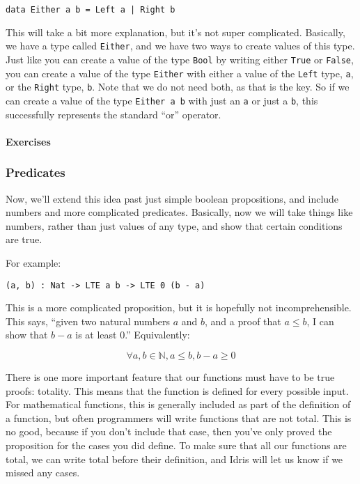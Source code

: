 \documentclass{article}
\newcommand{\inline}[1]{\texttt{#1}}
\begin{document}
\begin{verbatim}
data Either a b = Left a | Right b
\end{verbatim}

This will take a bit more explanation, but it's not super complicated.
Basically, we have a type called \inline{Either}, and we have two ways to create values of this type.
Just like you can create a value of the type \inline{Bool} by writing either \inline{True} or \inline{False}, you can create a value of the type \inline{Either} with either a value of the \inline{Left} type, \inline{a}, or the \inline{Right} type, \inline{b}.
Note that we do not need both, as that is the key.
So if we can create a value of the type \inline{Either a b} with just an \inline{a} or just a \inline{b}, this successfully represents the standard ``or'' operator.

\paragraph{Exercises}

\subsubsection{Predicates}
Now, we’ll extend this idea past just simple boolean propositions, and include numbers and more complicated predicates.
Basically, now we will take things like numbers, rather than just values of any type, and show that certain conditions are true.

For example:

\begin{verbatim}
(a, b) : Nat -> LTE a b -> LTE 0 (b - a)
\end{verbatim}

This is a more complicated proposition, but it is hopefully not incomprehensible.
This says, “given two natural numbers $a$ and $b$, and a proof that $a \leq b$, I can show that $b - a$ is at least $0$.”
Equivalently:

\[
    \forall a, b \in \mathbb{N}, a \leq b, b - a \geq 0
\]

There is one more important feature that our functions must have to be true proofs: totality.
This means that the function is defined for every possible input.
For mathematical functions, this is generally included as part of the definition of a function, but often programmers will write functions that are not total.
This is no good, because if you don't include that case, then you've only proved the proposition for the cases you did define.
To make sure that all our functions are total, we can write total before their definition, and Idris will let us know if we missed any cases.
\end{document}
